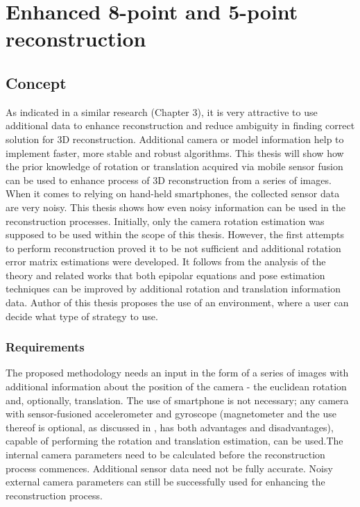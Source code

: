 \chapter{Enhanced 8-point and 5-point reconstruction}\label{chap:enh_5_8_point}
\section{Concept} %
As indicated in a similar research (Chapter 3), it is very attractive to use additional data to enhance reconstruction and reduce ambiguity in finding correct solution for 3D reconstruction. Additional camera or model information help to implement faster, more stable and robust algorithms. This thesis will show how the prior knowledge of rotation or translation acquired via mobile sensor fusion can be used to enhance process of 3D reconstruction from a series of images. When it comes to relying on hand-held smartphones, the collected sensor data are very noisy. This thesis shows how even noisy information can be used in the reconstruction processes. Initially, only the camera rotation estimation was supposed to be used within the scope of this thesis. However, the first attempts to perform reconstruction proved it to be not sufficient and additional rotation error matrix estimations were developed.
It follows from the analysis of the theory and related works that both epipolar equations and pose estimation techniques can be improved by additional rotation and translation information data.  Author of this thesis proposes the use of an environment, where a user can decide what type of strategy to use.
\subsection{Requirements}
The proposed methodology needs an input in the form of a series of images with additional information about the position of the camera - the euclidean rotation and, optionally, translation. The use of smartphone is not necessary; any camera with sensor-fusioned accelerometer and gyroscope (magnetometer and the use thereof is optional, as discussed in \cite{website:androidSensorOverview}, has both advantages and disadvantages), capable of performing the rotation and translation estimation, can be used.The internal camera parameters need to be calculated before the reconstruction process commences. Additional sensor data need not be fully accurate. Noisy external camera parameters can still be successfully used for enhancing the reconstruction process.
